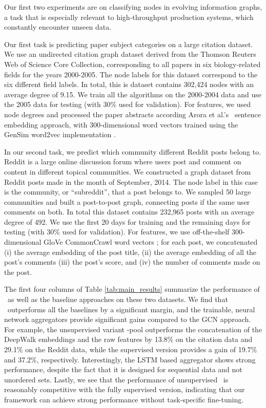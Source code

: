 Our first two experiments are on classifying nodes in evolving information graphs, a task that is especially relevant to high-throughput production systems, which constantly encounter unseen data. 

Our first task is predicting paper subject categories on a large citation dataset. 
We use an undirected citation graph dataset derived from the Thomson Reuters Web of Science Core Collection, corresponding to all papers in six biology-related fields for the years 2000-2005.
The node labels for this dataset correspond to the six different field labels. 
In total, this is dataset contains 302,424 nodes with an average degree of 9.15.
We train all the algorithms on the 2000-2004 data and use the 2005 data for testing (with 30\% used for validation). 
For features, we used node degrees and processed the paper abstracts according Arora et al.'s~\cite{arora2017simple} sentence embedding approach, with 300-dimensional word vectors trained using the GenSim word2vec implementation \cite{rehurek_lrec}.

In our second task, we predict which community different Reddit posts belong to. 
Reddit is a large online discussion forum where users post and comment on content in different topical communities. 
We constructed a graph dataset from Reddit posts made in the month of September, 2014. 
The node label in this case is the community, or ``subreddit'', that a post belongs to.  
We sampled 50 large communities and built a post-to-post graph, connecting posts if the same user comments on both. 
In total this dataset contains 232,965 posts with an average degree of 492.
We use the first 20 days for training and the remaining days for testing (with 30\% used for validation).  
For features, we use off-the-shelf 300-dimensional GloVe CommonCrawl word vectors \cite{pennington2014glove}; for each post, we concatenated (i) the average embedding of the post title, (ii) the average embedding of all the post's comments (iii) the post's score, and (iv) the number of comments made on the post. 

The first four columns of Table \ref{tab:main_results} summarize the performance of \name\, as well as the baseline approaches on these two datasets.
We find that \name\ outperforms all the baselines by a significant margin, and the trainable, neural network aggregators provide significant gains compared to the GCN approach. 
For example, the unsupervised variant \name-pool outperforms the concatenation of the DeepWalk embeddings and the raw features by 13.8\% on the citation data and 29.1\% on the Reddit data, while the supervised version provides a gain of 19.7\% and 37.2\%, respectively. 
Interestingly, the LSTM based aggregator shows strong performance, despite the fact that it is designed for sequential data and not unordered sets. 
Lastly, we see that the performance of unsupervised \name\ is reasonably competitive with the fully supervised version, indicating that our framework can achieve strong performance without task-specific fine-tuning. 
 
